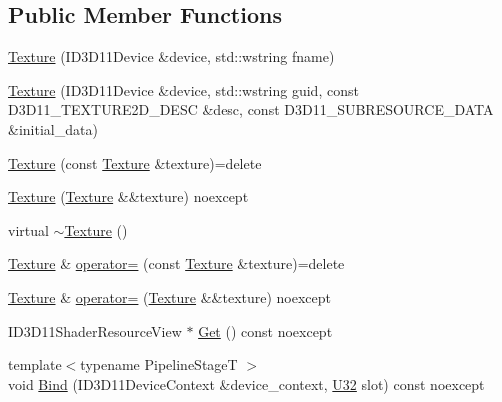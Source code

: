\subsection*{Public Member Functions}
\begin{DoxyCompactItemize}
\item 
\mbox{\hyperlink{classmage_1_1rendering_1_1_texture_a3e250ba6d5e08d876d4a15783f7081c4}{Texture}} (I\+D3\+D11\+Device \&device, std\+::wstring fname)
\item 
\mbox{\hyperlink{classmage_1_1rendering_1_1_texture_ae98272c1963a29d5d851ca27ff9bb65c}{Texture}} (I\+D3\+D11\+Device \&device, std\+::wstring guid, const D3\+D11\+\_\+\+T\+E\+X\+T\+U\+R\+E2\+D\+\_\+\+D\+E\+SC \&desc, const D3\+D11\+\_\+\+S\+U\+B\+R\+E\+S\+O\+U\+R\+C\+E\+\_\+\+D\+A\+TA \&initial\+\_\+data)
\item 
\mbox{\hyperlink{classmage_1_1rendering_1_1_texture_adde9e2339d2c10f1fc527a0d8d41d335}{Texture}} (const \mbox{\hyperlink{classmage_1_1rendering_1_1_texture}{Texture}} \&texture)=delete
\item 
\mbox{\hyperlink{classmage_1_1rendering_1_1_texture_a25eb2aa2277478fb5c17af996d509c57}{Texture}} (\mbox{\hyperlink{classmage_1_1rendering_1_1_texture}{Texture}} \&\&texture) noexcept
\item 
virtual \mbox{\hyperlink{classmage_1_1rendering_1_1_texture_af0ca576b1131fc0ac70725127b4fa7e4}{$\sim$\+Texture}} ()
\item 
\mbox{\hyperlink{classmage_1_1rendering_1_1_texture}{Texture}} \& \mbox{\hyperlink{classmage_1_1rendering_1_1_texture_a8d6af2ca731e11e2f0ef382bc8417234}{operator=}} (const \mbox{\hyperlink{classmage_1_1rendering_1_1_texture}{Texture}} \&texture)=delete
\item 
\mbox{\hyperlink{classmage_1_1rendering_1_1_texture}{Texture}} \& \mbox{\hyperlink{classmage_1_1rendering_1_1_texture_a8c9062f5d8045272c254eb0fa1ab4feb}{operator=}} (\mbox{\hyperlink{classmage_1_1rendering_1_1_texture}{Texture}} \&\&texture) noexcept
\item 
I\+D3\+D11\+Shader\+Resource\+View $\ast$ \mbox{\hyperlink{classmage_1_1rendering_1_1_texture_a7180e555c8e9ba55b364aa0a395d9ab8}{Get}} () const noexcept
\item 
{\footnotesize template$<$typename Pipeline\+StageT $>$ }\\void \mbox{\hyperlink{classmage_1_1rendering_1_1_texture_a2189fabd729f433b96b62fa409968677}{Bind}} (I\+D3\+D11\+Device\+Context \&device\+\_\+context, \mbox{\hyperlink{namespacemage_aa5d6eaabaac3cdd01873d6a3d27e90f3}{U32}} slot) const noexcept
\end{DoxyCompactItemize}
